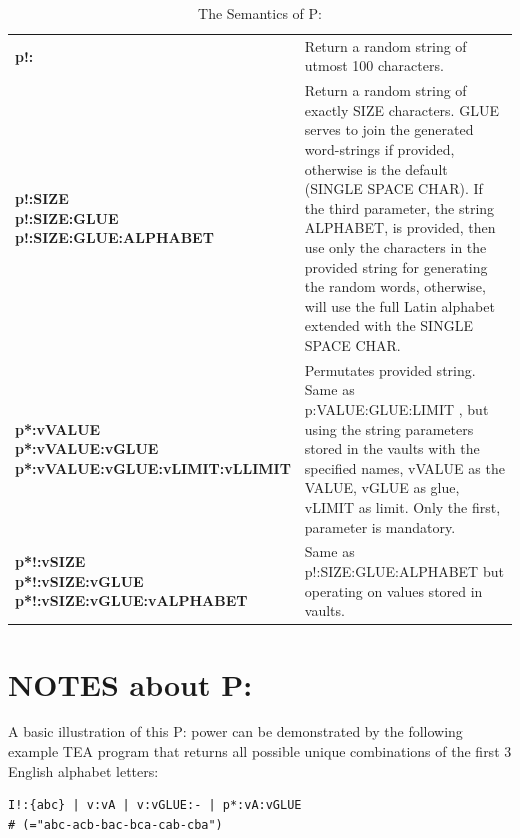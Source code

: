 \documentclass[a4paper, 18pt]{book} %
\begin{document}
{{\begin{table}[H]
\begin{tabular}{>{\bfseries}m{0.4\linewidth} | m{0.6\linewidth}}
p!: & Return a random string of utmost 100 characters.\\

\rowcolor{lightgray}\bfseries \makecell[l]{p!:SIZE\\p!:SIZE:GLUE\\p!:SIZE:GLUE:ALPHABET} & Return a random string of exactly SIZE characters.  GLUE serves to join the generated word-strings if provided, otherwise is the default (SINGLE SPACE CHAR). If the third parameter, the string ALPHABET, is provided, then use only the characters in the provided string for generating the random words, otherwise, will use the full Latin alphabet extended with the SINGLE SPACE CHAR.\\


\makecell[l]{p*:vVALUE\\p*:vVALUE:vGLUE\\p*:vVALUE:vGLUE:vLIMIT:vLLIMIT} & Permutates provided string. Same as  p:VALUE:GLUE:LIMIT , but using  the string parameters stored in the vaults with the specified names, vVALUE  as the VALUE, vGLUE as glue, vLIMIT as limit. Only the first, parameter is mandatory.\\

\rowcolor{lightgray}\bfseries \makecell[l]{p*!:vSIZE\\p*!:vSIZE:vGLUE\\p*!:vSIZE:vGLUE:vALPHABET} & Same as  p!:SIZE:GLUE:ALPHABET  but operating on values stored in vaults.\\

 \hline
\end{tabular}
\caption{The Semantics of P:}
\label{TABSEMP}
\end{table}


\section{NOTES about P:}
\label{SECNOTEP}


A basic illustration of this P: power can be demonstrated by the following example TEA program that returns all possible unique combinations of the first 3 English alphabet letters: 

\vspace{2em}

  \begin{tcolorbox}[teaterminalstyle, title=P: EXAMPLE 1: Compute Permutations of "ABC", breakable]
  \begin{lstlisting}[language=TEA,breaklines=true,]
I!:{abc} | v:vA | v:vGLUE:- | p*:vA:vGLUE 
# (="abc-acb-bac-bca-cab-cba")
   \end{lstlisting}
  \end{tcolorbox}

}}
\end{document}
